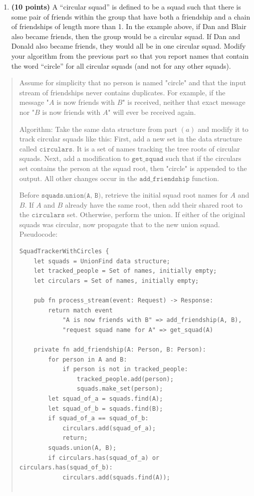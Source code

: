 \documentclass[11pt]{article}
\newcommand{\code}[1]{$\texttt{#1}$}
\begin{document}
\begin{enumerate}
\begin{enumerate}
\begin{quote}
    \end{quote}
\item {\bf (10 points)}
    A ``circular squad'' is defined to be a squad such that there is some pair of friends within the group that have both a friendship and a chain of friendships of length more than 1. In the example above, if Dan and Blair also became friends, then the group would be a circular squad. If Dan and Donald also became friends, they would all be in one circular squad. Modify your algorithm from the previous part so that you report names that contain the word ``circle'' for all circular squads (and not for any other squads).
\end{enumerate}
\begin{quote}
  \color{purple}
Assume for simplicity that no person is named "circle" and that the input stream of friendships never contains duplicates. For example, if the message "$A$ is now friends with $B$" is received, neither that exact message nor "$B$ is now friends with $A$" will ever be received again.

\medskip
Algorithm: Take the same data structure from part $(a)$ and modify it to track circular squads like this: First, add a new set in the data structure called \code{circulars}. It is a set of names tracking the tree roots of circular squads. Next, add a modification to \code{get\_squad} such that if the circulars set contains the person at the squad root, then "circle" is appended to the output. All other changes occur in the \code{add\_friendship} function.

\medskip
Before \code{squads.union(A, B)}, retrieve the initial squad root names for $A$ and $B$. If $A$ and $B$ already have the same root, then add their shared root to the \code{circulars} set. Otherwise, perform the union. If either of the original squads was circular, now propagate that to the new
union squad. Pseudocode:

\newpage
\begin{verbatim}
SquadTrackerWithCircles {
    let squads = UnionFind data structure;
    let tracked_people = Set of names, initially empty;
    let circulars = Set of names, initially empty;

    pub fn process_stream(event: Request) -> Response:
        return match event 
            "A is now friends with B" => add_friendship(A, B),
            "request squad name for A" => get_squad(A)

    private fn add_friendship(A: Person, B: Person):
        for person in A and B:
            if person is not in tracked_people:
                tracked_people.add(person);
                squads.make_set(person);
        let squad_of_a = squads.find(A);
        let squad_of_b = squads.find(B);
        if squad_of_a == squad_of_b:
            circulars.add(squad_of_a);
            return;
        squads.union(A, B);
        if circulars.has(squad_of_a) or circulars.has(squad_of_b):
            circulars.add(squads.find(A));
    

\end{verbatim}
\end{quote}
\end{enumerate}
\end{document}
